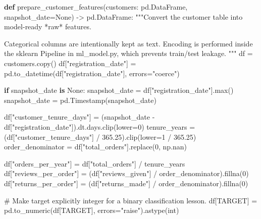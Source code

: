 \documentclass[
  indonesian,
  letterpaper,
  DIV=11,
  numbers=noendperiod]{scrreprt}
\newenvironment{Shaded}{\begin{snugshade}}{\end{snugshade}}
\newcommand{\BuiltInTok}[1]{\textcolor[rgb]{0.00,0.23,0.31}{#1}}
\newcommand{\CommentTok}[1]{\textcolor[rgb]{0.37,0.37,0.37}{#1}}
\newcommand{\ControlFlowTok}[1]{\textcolor[rgb]{0.00,0.23,0.31}{\textbf{#1}}}
\newcommand{\DecValTok}[1]{\textcolor[rgb]{0.68,0.00,0.00}{#1}}
\newcommand{\FloatTok}[1]{\textcolor[rgb]{0.68,0.00,0.00}{#1}}
\newcommand{\KeywordTok}[1]{\textcolor[rgb]{0.00,0.23,0.31}{\textbf{#1}}}
\newcommand{\NormalTok}[1]{\textcolor[rgb]{0.00,0.23,0.31}{#1}}
\newcommand{\OperatorTok}[1]{\textcolor[rgb]{0.37,0.37,0.37}{#1}}
\newcommand{\StringTok}[1]{\textcolor[rgb]{0.13,0.47,0.30}{#1}}
\newcommand{\VariableTok}[1]{\textcolor[rgb]{0.07,0.07,0.07}{#1}}
\begin{document}
\begin{Shaded}
\begin{Highlighting}[]
\KeywordTok{def}\NormalTok{ prepare\_customer\_features(customers: pd.DataFrame, snapshot\_date}\OperatorTok{=}\VariableTok{None}\NormalTok{) }\OperatorTok{{-}\textgreater{}}\NormalTok{ pd.DataFrame:}
    \CommentTok{"""Convert the customer table into model{-}ready *raw* features.}

\CommentTok{    Categorical columns are intentionally kept as text. Encoding is performed inside}
\CommentTok{    the sklearn Pipeline in ml\_model.py, which prevents train/test leakage.}
\CommentTok{    """}
\NormalTok{    df }\OperatorTok{=}\NormalTok{ customers.copy()}
\NormalTok{    df[}\StringTok{"registration\_date"}\NormalTok{] }\OperatorTok{=}\NormalTok{ pd.to\_datetime(df[}\StringTok{"registration\_date"}\NormalTok{], errors}\OperatorTok{=}\StringTok{"coerce"}\NormalTok{)}

    \ControlFlowTok{if}\NormalTok{ snapshot\_date }\KeywordTok{is} \VariableTok{None}\NormalTok{:}
\NormalTok{        snapshot\_date }\OperatorTok{=}\NormalTok{ df[}\StringTok{"registration\_date"}\NormalTok{].}\BuiltInTok{max}\NormalTok{()}
\NormalTok{    snapshot\_date }\OperatorTok{=}\NormalTok{ pd.Timestamp(snapshot\_date)}

\NormalTok{    df[}\StringTok{"customer\_tenure\_days"}\NormalTok{] }\OperatorTok{=}\NormalTok{ (snapshot\_date }\OperatorTok{{-}}\NormalTok{ df[}\StringTok{"registration\_date"}\NormalTok{]).dt.days.clip(lower}\OperatorTok{=}\DecValTok{0}\NormalTok{)}
\NormalTok{    tenure\_years }\OperatorTok{=}\NormalTok{ (df[}\StringTok{"customer\_tenure\_days"}\NormalTok{] }\OperatorTok{/} \FloatTok{365.25}\NormalTok{).clip(lower}\OperatorTok{=}\DecValTok{1} \OperatorTok{/} \FloatTok{365.25}\NormalTok{)}
\NormalTok{    order\_denominator }\OperatorTok{=}\NormalTok{ df[}\StringTok{"total\_orders"}\NormalTok{].replace(}\DecValTok{0}\NormalTok{, np.nan)}

\NormalTok{    df[}\StringTok{"orders\_per\_year"}\NormalTok{] }\OperatorTok{=}\NormalTok{ df[}\StringTok{"total\_orders"}\NormalTok{] }\OperatorTok{/}\NormalTok{ tenure\_years}
\NormalTok{    df[}\StringTok{"reviews\_per\_order"}\NormalTok{] }\OperatorTok{=}\NormalTok{ (df[}\StringTok{"reviews\_given"}\NormalTok{] }\OperatorTok{/}\NormalTok{ order\_denominator).fillna(}\DecValTok{0}\NormalTok{)}
\NormalTok{    df[}\StringTok{"returns\_per\_order"}\NormalTok{] }\OperatorTok{=}\NormalTok{ (df[}\StringTok{"returns\_made"}\NormalTok{] }\OperatorTok{/}\NormalTok{ order\_denominator).fillna(}\DecValTok{0}\NormalTok{)}

    \CommentTok{\# Make target explicitly integer for a binary classification lesson.}
\NormalTok{    df[TARGET] }\OperatorTok{=}\NormalTok{ pd.to\_numeric(df[TARGET], errors}\OperatorTok{=}\StringTok{"raise"}\NormalTok{).astype(}\BuiltInTok{int}\NormalTok{)}


\end{Highlighting}
\end{Shaded}
\end{document}
